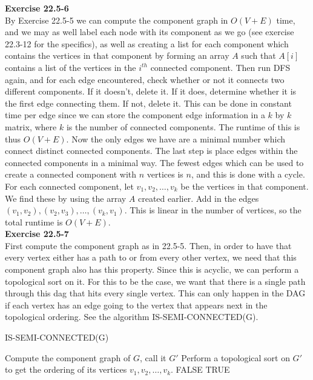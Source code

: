 \documentclass{article}
\begin{document}
\noindent\textbf{Exercise 22.5-6}\\

By Exercise 22.5-5 we can compute the component graph in $O(V+E)$ time, and we may as well label each node with its component as we go (see exercise 22.3-12 for the specifics), as well as creating a list for each component which contains the vertices in that component by forming an array $A$ such that $A[i]$ contains a list of the vertices in the $i^{th}$ connected component.  Then run DFS again, and for each edge encountered, check whether or not it connects two different components.  If it doesn't, delete it.  If it does, determine whether it is the first edge connecting them.  If not, delete it.  This can be done in constant time per edge since we can store the component edge information in a $k$ by $k$ matrix, where $k$ is the number of connected components.  The runtime of this is thus $O(V+E)$.  Now the only edges we have are a minimal number which connect distinct connected components. The last step is place edges within the connected components in a minimal way.  The fewest edges which can be used to create a connected component with $n$ vertices is $n$, and this is done with a cycle. For each connected component, let $v_1, v_2, \ldots, v_k$ be the vertices in that component.  We find these by using the array $A$ created earlier.  Add in the edges $(v_1, v_2), (v_2,v_3), \ldots, (v_k, v_1)$. This is linear in the number of vertices, so the total runtime is $O(V+E)$.\\

\noindent\textbf{Exercise 22.5-7}\\ 

First compute the component graph as in 22.5-5. Then, in order to have that every vertex either has a path to or from every other vertex, we need that this component graph also has this property. Since this is acyclic, we can perform a topological sort on it. For this to be the case, we want that there is a single path through this dag that hits every single vertex. This can only happen in the DAG if each vertex has an edge going to the vertex that appears next in the topological ordering. See the algorithm IS-SEMI-CONNECTED(G).\\

\begin{algorithm}
\caption{IS-SEMI-CONNECTED(G)}
\begin{algorithmic}
\State Compute the component graph of $G$, call it $G'$
\State Perform a topological sort on $G'$ to get the ordering of its vertices $v_1,v_2, \ldots, v_k$.
\State \Return FALSE
\EndIf
\EndFor
\State \Return TRUE
\end{algorithmic}
\end{algorithm}
\end{document}
